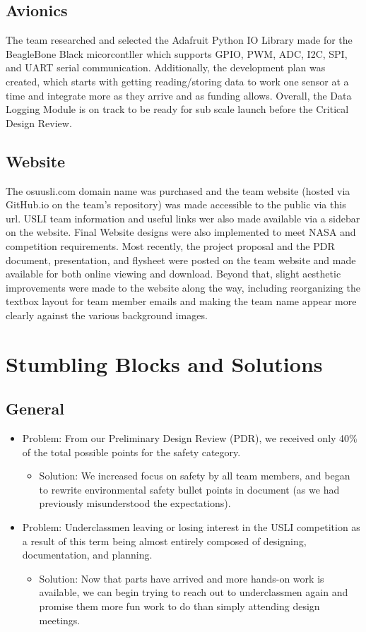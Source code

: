 \documentclass[onecolumn, draftclsnofoot,10pt, compsoc]{IEEEtran}
\begin{document}
\subsection{Avionics}
The team researched and selected the Adafruit Python IO Library made for the BeagleBone Black micorcontller which supports GPIO, PWM, ADC, I2C, SPI, and UART serial communication. Additionally, the development plan was created, which starts with getting reading/storing data to work one sensor at a time and integrate more as they arrive and as funding allows. Overall, the Data Logging Module is on track to be ready for sub scale launch before the Critical Design Review.
\subsection{Website}
The osuusli.com domain name was purchased and the team website (hosted via GitHub.io on the team's repository) was made accessible to the public via this url. USLI team information and useful links wer also made available via a sidebar on the website. Final Website designs were also implemented to meet NASA and competition requirements. Most recently, the project proposal and the PDR document, presentation, and flysheet were posted on the team website and made available for both online viewing and download. Beyond that, slight aesthetic improvements were made to the website along the way, including reorganizing the textbox layout for team member emails and making the team name appear more clearly against the various background images.
\section{Stumbling Blocks and Solutions}
\subsection{General}
\begin{itemize}
\item Problem: From our Preliminary Design Review (PDR), we received only 40\% of the total possible points for the safety category.
\begin{itemize}
\item Solution: We increased focus on safety by all team members, and began to rewrite environmental safety bullet points in document (as we had previously misunderstood the expectations).
\end{itemize}
\item Problem: Underclassmen leaving or losing interest in the USLI competition as a result of this term being almost entirely composed of designing, documentation, and planning.
\begin{itemize}
\item Solution: Now that parts have arrived and more hands-on work is available, we can begin trying to reach out to underclassmen again and promise them more fun work to do than simply attending design meetings.
\end{itemize}
\end{itemize}
\end{document}
